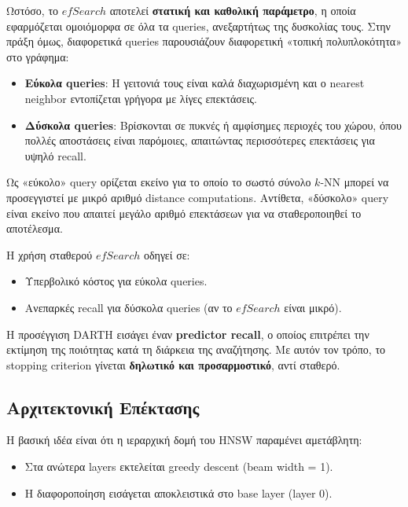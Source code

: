 \documentclass[12pt,a4paper]{article}
\begin{document}
Ωστόσο, το $efSearch$ αποτελεί \textbf{στατική και καθολική παράμετρο}, η οποία εφαρμόζεται ομοιόμορφα σε όλα τα queries, ανεξαρτήτως της δυσκολίας τους. Στην πράξη όμως, διαφορετικά queries παρουσιάζουν διαφορετική «τοπική πολυπλοκότητα» στο γράφημα:

\begin{itemize}
\item \textbf{Εύκολα queries}: Η γειτονιά τους είναι καλά διαχωρισμένη και ο nearest neighbor εντοπίζεται γρήγορα με λίγες επεκτάσεις.
\item \textbf{Δύσκολα queries}: Βρίσκονται σε πυκνές ή αμφίσημες περιοχές του χώρου, όπου πολλές αποστάσεις είναι παρόμοιες, απαιτώντας περισσότερες επεκτάσεις για υψηλό recall.
\end{itemize}

Ως «εύκολο» query ορίζεται εκείνο για το οποίο το σωστό σύνολο $k$-NN μπορεί να προσεγγιστεί με μικρό αριθμό distance computations. Αντίθετα, «δύσκολο» query είναι εκείνο που απαιτεί μεγάλο αριθμό επεκτάσεων για να σταθεροποιηθεί το αποτέλεσμα.

Η χρήση σταθερού $efSearch$ οδηγεί σε:

\begin{itemize}
\item Υπερβολικό κόστος για εύκολα queries.
\item Ανεπαρκές recall για δύσκολα queries (αν το $efSearch$ είναι μικρό).
\end{itemize}

Η προσέγγιση DARTH εισάγει έναν \textbf{predictor recall}, ο οποίος επιτρέπει την εκτίμηση της ποιότητας κατά τη διάρκεια της αναζήτησης. Με αυτόν τον τρόπο, το stopping criterion γίνεται \textbf{δηλωτικό και προσαρμοστικό}, αντί σταθερό.

\subsection{Αρχιτεκτονική Επέκτασης}

Η βασική ιδέα είναι ότι η ιεραρχική δομή του HNSW παραμένει αμετάβλητη:

\begin{itemize}
    \item Στα ανώτερα layers εκτελείται greedy descent (beam width = 1).
    \item Η διαφοροποίηση εισάγεται αποκλειστικά στο base layer (layer 0).
\end{itemize}
\end{document}
